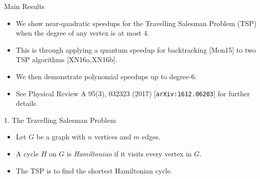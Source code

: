 \documentclass[]{templates/poster}
\begin{document}

\begin{frame}{} 

\begin{columns}[t]
  \begin{column}{0.422\linewidth}
  \begin{block}{\Large Main Results}
  \begin{itemize}
  \item We show near-quadratic speedups for the Travelling Salesman Problem (TSP) when the degree of any vertex is at most $4$.
  
  \item This is through applying a quantum speedup for backtracking [Mon15] to two TSP algorithms [XN16a,XN16b].
  
  \item We then demonstrate polynomial speedups up to degree-6.
  
  \item See Physical Review A 95(3), 032323 (2017) [{\tt arXiv:1612.06203}] for further details.
  \end{itemize}
  \end{block}

  \begin{block}{\Large 1. The Travelling Salesman Problem}
  \begin{itemize}
  \item Let $G$ be a graph with $n$ vertices and $m$ edges.
  
  \item A cycle $H$ on $G$ is {\em Hamiltonian} if it visits every vertex in $G$.
  
  \item The TSP is to find the shortest Hamiltonian cycle.
  

\end{itemize}
\end{block}
\end{column}
\end{columns}
\end{frame}
\end{document}

